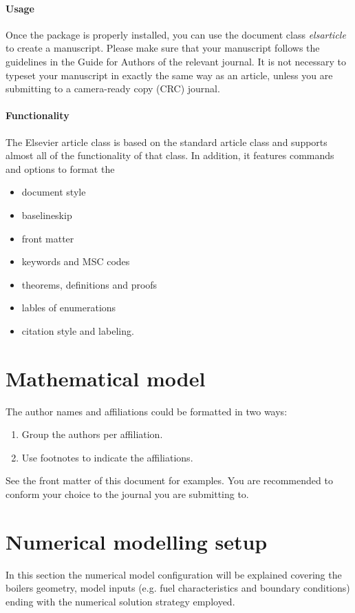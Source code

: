 \documentclass[review]{elsarticle}
\begin{document}
\paragraph{Usage} Once the package is properly installed, you can use the document class \emph{elsarticle} to create a manuscript. Please make sure that your manuscript follows the guidelines in the Guide for Authors of the relevant journal. It is not necessary to typeset your manuscript in exactly the same way as an article, unless you are submitting to a camera-ready copy (CRC) journal.

\paragraph{Functionality} The Elsevier article class is based on the standard article class and supports almost all of the functionality of that class. In addition, it features commands and options to format the
\begin{itemize}
\item document style
\item baselineskip
\item front matter
\item keywords and MSC codes
\item theorems, definitions and proofs
\item lables of enumerations
\item citation style and labeling.
\end{itemize}

\section{Mathematical model}

The author names and affiliations could be formatted in two ways:
\begin{enumerate}[(1)]
\item Group the authors per affiliation.
\item Use footnotes to indicate the affiliations.
\end{enumerate}
See the front matter of this document for examples. You are recommended to conform your choice to the journal you are submitting to.

\section{Numerical modelling setup}
In this section the numerical model configuration will be explained covering  the boilers geometry,  model inputs (e.g. fuel characteristics and boundary conditions) ending with the numerical solution strategy employed.
\end{document}
